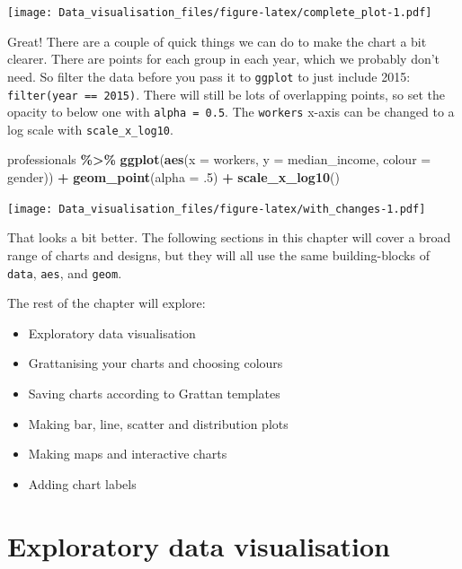 \documentclass[
]{book}
\newenvironment{Shaded}{\begin{snugshade}}{\end{snugshade}}
\newcommand{\DataTypeTok}[1]{\textcolor[rgb]{0.13,0.29,0.53}{#1}}
\newcommand{\FloatTok}[1]{\textcolor[rgb]{0.00,0.00,0.81}{#1}}
\newcommand{\KeywordTok}[1]{\textcolor[rgb]{0.13,0.29,0.53}{\textbf{#1}}}
\newcommand{\NormalTok}[1]{#1}
\newcommand{\OperatorTok}[1]{\textcolor[rgb]{0.81,0.36,0.00}{\textbf{#1}}}
\newcommand{\StringTok}[1]{\textcolor[rgb]{0.31,0.60,0.02}{#1}}
\providecommand{\tightlist}{%
  \setlength{\itemsep}{0pt}\setlength{\parskip}{0pt}}
\begin{document}
\texttt{[image: Data\_visualisation\_files/figure-latex/complete\_plot-1.pdf]}

Great! There are a couple of quick things we can do to make the chart a bit clearer. There are points for each group in each year, which we probably don't need. So filter the data before you pass it to \texttt{ggplot} to just include 2015: \texttt{filter(year\ ==\ 2015)}. There will still be lots of overlapping points, so set the opacity to below one with \texttt{alpha\ =\ 0.5}. The \texttt{workers} x-axis can be changed to a log scale with \texttt{scale\_x\_log10}.

\begin{Shaded}
\begin{Highlighting}[]
\NormalTok{professionals }\OperatorTok{\%\textgreater{}\%}\StringTok{ }
\StringTok{        }\KeywordTok{ggplot}\NormalTok{(}\KeywordTok{aes}\NormalTok{(}\DataTypeTok{x =}\NormalTok{ workers,}
                   \DataTypeTok{y =}\NormalTok{ median\_income,}
                   \DataTypeTok{colour =}\NormalTok{ gender)) }\OperatorTok{+}\StringTok{ }
\StringTok{        }\KeywordTok{geom\_point}\NormalTok{(}\DataTypeTok{alpha =} \FloatTok{.5}\NormalTok{) }\OperatorTok{+}\StringTok{ }
\StringTok{        }\KeywordTok{scale\_x\_log10}\NormalTok{()}
\end{Highlighting}
\end{Shaded}

\texttt{[image: Data\_visualisation\_files/figure-latex/with\_changes-1.pdf]}

That looks a bit better. The following sections in this chapter will cover a broad range of charts and designs, but they will all use the same building-blocks of \texttt{data}, \texttt{aes}, and \texttt{geom}.

The rest of the chapter will explore:

\begin{itemize}
\tightlist
\item
  Exploratory data visualisation
\item
  Grattanising your charts and choosing colours
\item
  Saving charts according to Grattan templates
\item
  Making bar, line, scatter and distribution plots
\item
  Making maps and interactive charts
\item
  Adding chart labels
\end{itemize}

\hypertarget{exploratory-data-visualisation}{%
\section{Exploratory data visualisation}\label{exploratory-data-visualisation}}
\end{document}
